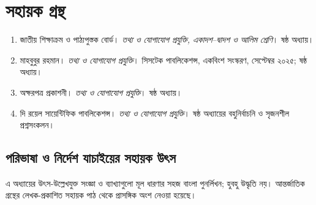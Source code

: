 \begingroup\small
\section*{সহায়ক গ্রন্থ}
\begin{enumerate}
\item জাতীয় শিক্ষাক্রম ও পাঠ্যপুস্তক বোর্ড। \textit{তথ্য ও যোগাযোগ প্রযুক্তি, একাদশ--দ্বাদশ ও আলিম শ্রেণি}। ষষ্ঠ অধ্যায়।
\item মাহবুবুর রহমান। \textit{তথ্য ও যোগাযোগ প্রযুক্তি}। সিসটেক পাবলিকেশন্স, একবিংশ সংস্করণ, সেপ্টেম্বর ২০২৫; ষষ্ঠ অধ্যায়।
\item অক্ষরপত্র প্রকাশনী। \textit{তথ্য ও যোগাযোগ প্রযুক্তি}। ষষ্ঠ অধ্যায়।
\item দি রয়েল সায়েন্টিফিক পাবলিকেশন্স। \textit{তথ্য ও যোগাযোগ প্রযুক্তি}। ষষ্ঠ অধ্যায়ের বহুনির্বাচনি ও সৃজনশীল প্রশ্নসংকলন।
\end{enumerate}
\subsection*{পরিভাষা ও নির্দেশ যাচাইয়ের সহায়ক উৎস}
এ অধ্যায়ের উৎস-উল্লেখযুক্ত সংজ্ঞা ও ব্যাখ্যাগুলো মূল ধারণার সহজ বাংলা পুনর্লিখন; হুবহু উদ্ধৃতি নয়। আন্তর্জাতিক গ্রন্থের লেখক-প্রকাশিত সহায়ক পাঠ থেকে প্রাসঙ্গিক অংশ নেওয়া হয়েছে।

